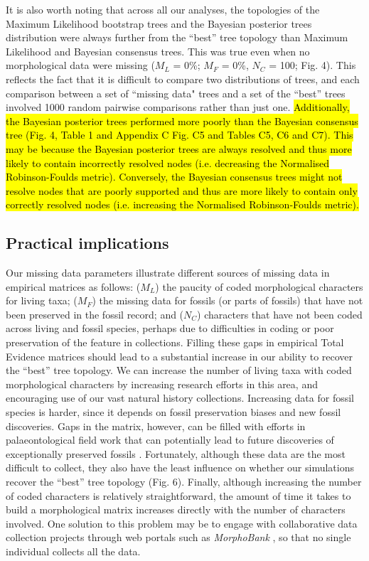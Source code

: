 \documentclass[12pt,letterpaper]{article}
\begin{document}
It is also worth noting that across all our analyses, the topologies of the Maximum Likelihood bootstrap trees and the Bayesian posterior trees distribution were always further from the ``best'' tree topology than Maximum Likelihood and Bayesian consensus trees.
This was true even when no morphological data were missing ($M_{L}$ = 0\%; $M_{F}$ = 0\%, $N_{C}$ = 100; Fig. 4).
This reflects the fact that it is difficult to compare two distributions of trees, and each comparison between a set of ``missing data" trees and a set of the ``best'' trees involved 1000 random pairwise comparisons rather than just one.
\hl{Additionally, the Bayesian posterior trees performed more poorly than the Bayesian consensus tree (Fig. 4, Table 1 and Appendix C Fig. C5 and Tables C5, C6 and C7).
This may be because the Bayesian posterior trees are always resolved and thus more likely to contain incorrectly resolved nodes (i.e. decreasing the Normalised Robinson-Foulds metric).
Conversely, the Bayesian consensus trees might not resolve nodes that are poorly supported and thus are more likely to contain only correctly resolved nodes (i.e. increasing the Normalised Robinson-Foulds metric).}


\subsection{Practical implications}
Our missing data parameters illustrate different sources of missing data in empirical matrices as follows: ($M_{L}$) the paucity of coded morphological characters for living taxa; ($M_{F}$) the missing data for fossils (or parts of fossils) that have not been preserved in the fossil record; and ($N_{C}$) characters that have not been coded across living and fossil species, perhaps due to difficulties in coding or poor preservation of the feature in collections.
Filling these gaps in empirical Total Evidence matrices should lead to a substantial increase in our ability to recover the ``best'' tree topology.
We can increase the number of living taxa with coded morphological characters by increasing research efforts in this area, and encouraging use of our vast natural history collections.
Increasing data for fossil species is harder, since it depends on fossil preservation biases and new fossil discoveries.
Gaps in the matrix, however, can be filled with efforts in palaeontological field work that can potentially lead to future discoveries of exceptionally preserved fossils \citep[e.g.][]{nithe2013}.
Fortunately, although these data are the most difficult to collect, they also have the least influence on whether our simulations recover the ``best'' tree topology (Fig. 6).
Finally, although increasing the number of coded characters is relatively straightforward, the amount of time it takes to build a morphological matrix increases directly with the number of characters involved.
One solution to this problem may be to engage with collaborative data collection projects through web portals such as \textit{MorphoBank} \citep{morphobank}, so that no single individual collects all the data.
\end{document}
